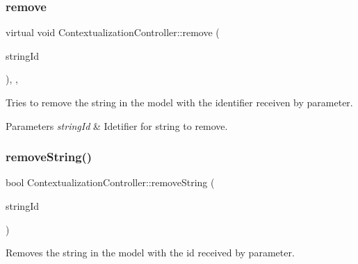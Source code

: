 \mbox{\label{classContextualizationController_ae06d4c794e77321439668aadc141aca5}} 
\subsubsection{\texorpdfstring{remove}{remove}}
{\footnotesize\ttfamily virtual void Contextualization\+Controller\+::remove (\begin{DoxyParamCaption}\item[{Q\+String}]{string\+Id }\end{DoxyParamCaption})\hspace{0.3cm}{\ttfamily [protected]}, {}, {\ttfamily [slot]}}



Tries to remove the string in the model with the identifier receiven by parameter. 


\begin{DoxyParams}{Parameters}
{\em string\+Id} & Idetifier for string to remove. \\
\hline
\end{DoxyParams}
\mbox{\label{classContextualizationController_adedb36b408caff11f15632998e7b9413}} 
\subsubsection{\texorpdfstring{remove\+String()}{removeString()}\hspace{0.1cm}{\footnotesize\ttfamily [1/2]}}
{\footnotesize\ttfamily bool Contextualization\+Controller\+::remove\+String (\begin{DoxyParamCaption}\item[{Q\+String}]{string\+Id }\end{DoxyParamCaption})\hspace{0.3cm}{\ttfamily [protected]}}



Removes the string in the model with the id received by parameter. 

